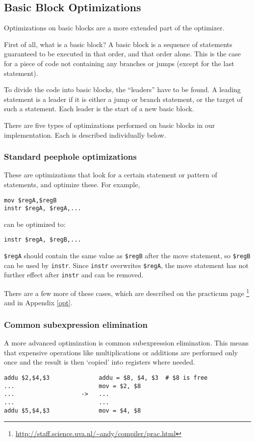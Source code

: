 \documentclass[10pt,a4paper]{article}
\begin{document}
\subsection{Basic Block Optimizations}

Optimizations on basic blocks are a more extended part of the optimizer.

First of all, what is a basic block? A basic block is a sequence of statements
guaranteed to be executed in that order, and that order alone. This is the case
for a piece of code not containing any branches or jumps (except for the last
statement).

To divide the code into basic blocks, the ``leaders'' have to be found. A
leading statement is a leader if it is either a jump or branch statement, or
the target of such a statement. Each leader is the start of a new basic block.

There are five types of optimizations performed on basic blocks in our
implementation. Each is described individually below.

\subsubsection{Standard peephole optimizations}

These are optimizations that look for a certain statement or pattern of
statements, and optimize these. For example,
\begin{verbatim}
mov $regA,$regB
instr $regA, $regA,...
\end{verbatim}
can be optimized to:
\begin{verbatim}
instr $regA, $regB,...
\end{verbatim}
\texttt{\$regA} should contain the same value as \texttt{\$regB} after the move
statement, so \texttt{\$regB} can be used by \texttt{instr}.  Since
\texttt{instr} overwrites \texttt{\$regA}, the move statement has not further
effect after \texttt{instr} and can be removed.

There are a few more of these cases, which are described on the practicum page
\footnote{\url{http://staff.science.uva.nl/~andy/compiler/prac.html}} and in
Appendix \ref{opt}.

\subsubsection{Common subexpression elimination}

A more advanced optimization is common subexpression elimination. This means
that expensive operations like multiplications or additions are performed only
once and the result is then `copied' into registers where needed.
\begin{verbatim}
addu $2,$4,$3              addu = $8, $4, $3  # $8 is free
...                        mov = $2, $8
...                   ->   ...
...                        ...
addu $5,$4,$3              mov = $4, $8
\end{verbatim}
\end{document}
